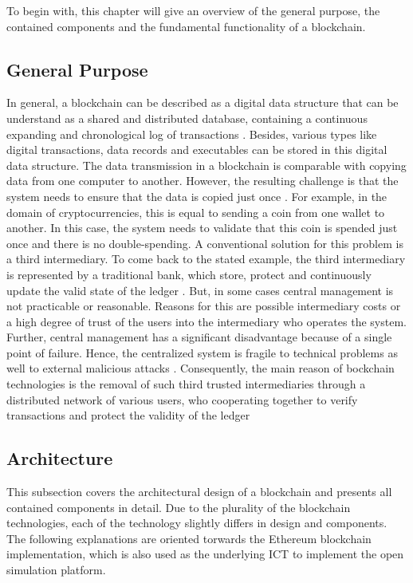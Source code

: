 To begin with, this chapter will give an overview of the general purpose, the contained components and the fundamental functionality of a blockchain. 

\subsection{General Purpose}
In general, a blockchain can be described as a digital data structure that can be understand as a shared and distributed database, containing a continuous expanding and chronological log of transactions . Besides, various types like digital transactions, data records and executables can be stored in this digital data structure. The data transmission in a blockchain is comparable with copying data from one computer to another. However, the resulting challenge is that the system needs to ensure that the data is copied just once . For example, in the domain of cryptocurrencies, this is equal to sending a coin from one wallet to another. In this case, the system needs to validate that this coin is spended just once and there is no double-spending. A conventional solution for this problem is a third intermediary. To come back to the stated example, the third intermediary is represented by a traditional bank, which store, protect and continuously update the valid state of the ledger . But, in some cases central management is not practicable or reasonable. Reasons for this are possible intermediary costs or a high degree of trust of the users into the intermediary who operates the system. Further, central management has a significant disadvantage because of a single point of failure. Hence, the centralized system is fragile to technical problems as well to external malicious attacks .
Consequently, the main reason of bockchain technologies is the removal of such third trusted intermediaries through a distributed network of various users, who cooperating together to verify transactions and protect the validity of the ledger

\subsection{Architecture}
This subsection covers the architectural design of a blockchain and presents all contained components in detail. Due to the plurality of the blockchain technologies, each of the technology slightly differs in design and components. The following explanations are oriented torwards the Ethereum blockchain implementation, which is also used as the underlying ICT to implement the open simulation platform.

